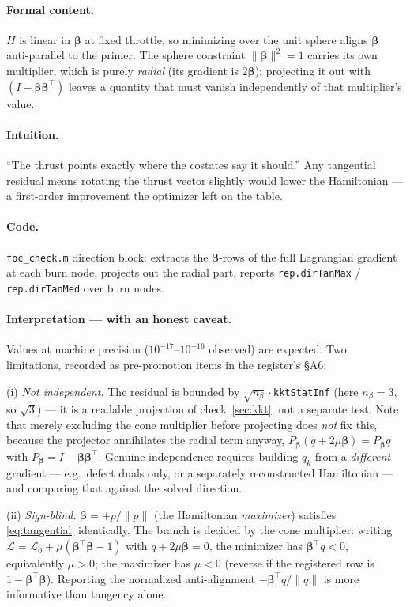 \documentclass[11pt]{article}
\newcommand{\vbeta}{\boldsymbol{\beta}}
\newcommand{\Lag}{\mathcal{L}}
\newcommand{\Ham}{H}
\newcommand{\file}[1]{\texttt{#1}}
\newcommand{\code}[1]{\texttt{#1}}
\begin{document}
\paragraph{Formal content.}
$\Ham$ is linear in $\vbeta$ at fixed throttle, so minimizing over the unit
sphere aligns $\vbeta$ anti-parallel to the primer. The sphere constraint
$\|\vbeta\|^2=1$ carries its own multiplier, which is purely \emph{radial}
(its gradient is $2\vbeta$); projecting it out with $(I-\vbeta\vbeta^{\top})$
leaves a quantity that must vanish independently of that multiplier's value.

\paragraph{Intuition.}
``The thrust points exactly where the costates say it should.'' Any tangential
residual means rotating the thrust vector slightly would lower the Hamiltonian
--- a first-order improvement the optimizer left on the table.

\paragraph{Code.}
\file{foc\_check.m} direction block: extracts the $\vbeta$-rows of the full
Lagrangian gradient at each burn node, projects out the radial part, reports
\code{rep.dirTanMax} / \code{rep.dirTanMed} over burn nodes.

\paragraph{Interpretation --- with an honest caveat.}
Values at machine precision ($10^{-17}$--$10^{-16}$ observed) are expected.
Two limitations, recorded as pre-promotion items in the register's \S A6:

(i) \emph{Not independent.} The residual is bounded by
$\sqrt{n_\beta}\cdot$\code{kktStatInf} (here $n_\beta=3$, so $\sqrt3$) --- it
is a readable projection of check~\ref{sec:kkt}, not a separate test.
Note that merely excluding the cone
multiplier before projecting does \emph{not} fix this, because the projector
annihilates the radial term anyway,
$P_{\vbeta}(q+2\mu\vbeta)=P_{\vbeta}q$ with $P_{\vbeta}=I-\vbeta\vbeta^{\!\top}$.
Genuine independence requires building $q_k$ from a \emph{different} gradient
--- e.g.\ defect duals only, or a separately reconstructed Hamiltonian --- and
comparing that against the solved direction.

(ii) \emph{Sign-blind.} $\vbeta=+p/\|p\|$ (the Hamiltonian \emph{maximizer})
satisfies \eqref{eq:tangential} identically. The branch is decided by the cone
multiplier: writing $\Lag=\Lag_0+\mu(\vbeta^{\!\top}\vbeta-1)$ with
$q+2\mu\vbeta=0$, the minimizer has $\vbeta^{\!\top}q<0$, equivalently
$\mu>0$; the maximizer has $\mu<0$ (reverse if the registered row is
$1-\vbeta^{\!\top}\vbeta$). Reporting the normalized anti-alignment
$-\vbeta^{\!\top}q/\|q\|$ is more informative than tangency alone.
\end{document}

